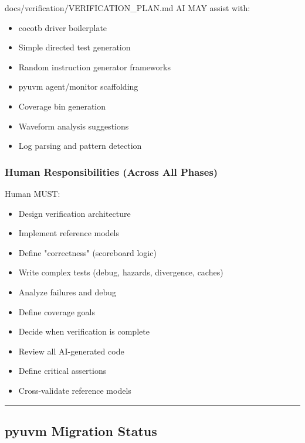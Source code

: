 \begin{relocated}{docs/verification/VERIFICATION_PLAN.md}
AI MAY assist with:

\begin{itemize}
\tightlist
\item
  \ok{} cocotb driver boilerplate
\item
  \ok{} Simple directed test generation
\item
  \ok{} Random instruction generator frameworks
\item
  \ok{} pyuvm agent/\allowbreak{}monitor scaffolding
\item
  \ok{} Coverage bin generation
\item
  \ok{} Waveform analysis suggestions
\item
  \ok{} Log parsing and pattern detection
\end{itemize}

\subsubsection{Human Responsibilities (Across All Phases)}\label{ds:ch:verification-plan:human-responsibilities-across-all-phases}

Human MUST:

\begin{itemize}
\tightlist
\item
  \warn{} Design verification architecture
\item
  \warn{} Implement reference models
\item
  \warn{} Define "correctness" (scoreboard logic)
\item
  \warn{} Write complex tests (debug, hazards, divergence, caches)
\item
  \warn{} Analyze failures and debug
\item
  \warn{} Define coverage goals
\item
  \warn{} Decide when verification is complete
\item
  \warn{} Review all AI-generated code
\item
  \warn{} Define critical assertions
\item
  \warn{} Cross-validate reference models
\end{itemize}

\begin{center}\rule{0.5\linewidth}{0.5pt}\end{center}

\subsection{pyuvm Migration Status}\label{ds:ch:verification-plan:pyuvm-migration-status}


\end{relocated}
